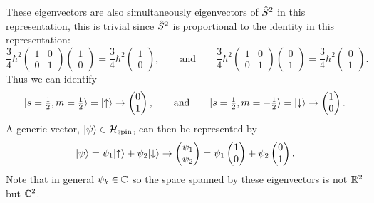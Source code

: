 These eigenvectors are also simultaneously eigenvectors of \(\hat{S}^2\) in this representation, this is trivial since \(\hat{S}^2\) is proportional to the identity in this representation:
\[
\frac{3}{4}\hbar^2
\begin{pmatrix}
    1 & 0\\
    0 & 1
\end{pmatrix}
\begin{pmatrix}
    1\\ 0
\end{pmatrix}
= \frac{3}{4}\hbar^2
\begin{pmatrix}
    1\\ 0
\end{pmatrix}
,\qquad\text{and}\qquad
\frac{3}{4}\hbar^2
\begin{pmatrix}
    1 & 0\\
    0 & 1
\end{pmatrix}
\begin{pmatrix}
    0\\ 1
\end{pmatrix}
= \frac{3}{4}\hbar^2
\begin{pmatrix}
    0\\ 1
\end{pmatrix}
.
\]
Thus we can identify
\[
\vert {s=\tfrac{1}{2}, m=\tfrac{1}{2}} \rangle = \vert {\uparrow} \rangle \mathrel{\rightarrow} 
\begin{pmatrix}
    0\\ 1
\end{pmatrix}
,\qquad\text{and}\qquad
\vert {s = \tfrac{1}{2}, m=-\tfrac{1}{2}} \rangle = \vert {\downarrow} \rangle \mathrel{\rightarrow}
\begin{pmatrix}
    1\\ 0
\end{pmatrix}
.
\]
A generic vector, \(\vert {\psi} \rangle\in\mathcal{H}_{\text{spin}}\), can then be represented by
\[
\vert {\psi} \rangle = \psi_1\vert {\uparrow} \rangle + \psi_2\vert {\downarrow} \rangle \mathrel{\rightarrow}
\begin{pmatrix}
    \psi_1\\
    \psi_2
\end{pmatrix}
=
\psi_1
\begin{pmatrix}
    1\\ 0
\end{pmatrix}
+ \psi_2
\begin{pmatrix}
    0\\ 1
\end{pmatrix}
.
\]
Note that in general \(\psi_k\in\mathbb{C}\) so the space spanned by these eigenvectors is not \(\mathbb{R}^2\) but \(\mathbb{C}^2\).

